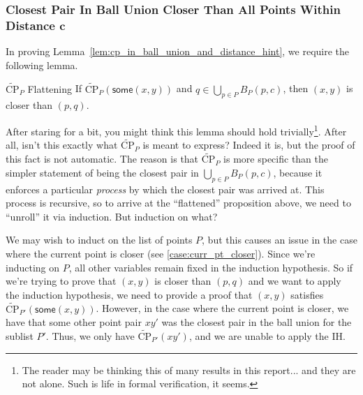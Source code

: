 \documentclass{article}
\begin{document}




\subsubsection{Closest Pair In Ball Union Closer Than All Points Within Distance $\mathbf{c}$}
\label{sec:cp_in_ball_union_high_level}
In proving Lemma~\ref{lem:cp_in_ball_union_and_distance_hint}, we require the following lemma.
\begin{tcblemma}{$\widetilde{\text{CP}}_P$ Flattening}{}
  If $\widetilde{\text{CP}}_P(\mathsf{some}(x, y))$ and $q \in \bigcup_{p \in P} B_P(p, c)$, then $(x, y)$ is closer than $(p, q)$.
\end{tcblemma}
After staring for a bit, you might think this lemma should hold trivially\footnote{
  The reader may be thinking this of many results in this report... and they are not alone.
  Such is life in formal verification, it seems.
}.
After all, isn't this exactly what $\widetilde{\text{CP}}_P$ is meant to express?
Indeed it is, but the proof of this fact is not automatic.
The reason is that $\widetilde{\text{CP}}_P$ is more specific than the simpler statement of being the closest pair in $\bigcup_{p \in P} B_P(p, c)$, because it enforces a particular \textit{process} by which the closest pair was arrived at.
This process is recursive, so to arrive at the ``flattened'' proposition above, we need to ``unroll'' it via induction.
But induction on what?

We may wish to induct on the list of points $P$, but this causes an issue in the case where the current point is closer (see \ref{case:curr_pt_closer}).
Since we're inducting on $P$, all other variables remain fixed in the induction hypothesis.
So if we're trying to prove that $(x,y)$ is closer than $(p,q)$ and we want to apply the induction hypothesis, we need to provide a proof that $(x, y)$ satisfies $\widetilde{\text{CP}}_{P'}(\mathsf{some}(x, y))$.
However, in the case where the current point is closer, we have that some other point pair $x\!y'$ was the closest pair in the ball union for the sublist $P'$.
Thus, we only have $\widetilde{\text{CP}}_{P'}(x\!y')$, and we are unable to apply the IH.
\end{document}
